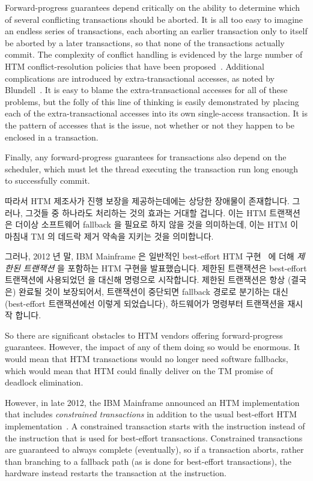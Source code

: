 Forward-progress guarantees depend critically on the ability to determine
which of several conflicting transactions should be aborted.
It is all too easy to imagine an endless series of transactions, each
aborting an earlier transaction only to itself be aborted by a later
transactions, so that none of the transactions actually commit.
The complexity of conflict handling is
evidenced by the large number of HTM conflict-resolution policies
that have been proposed~\cite{EgeAkpinar2011HTM2TLE,YujieLiu2011ToxicTransactions}.
Additional complications are introduced by extra-transactional accesses,
as noted by Blundell~\cite{Blundell2006TMdeadlock}.
It is easy to blame the extra-transactional accesses for all of these
problems, but the folly of this line of thinking is easily demonstrated
by placing each of the extra-transactional accesses into its own
single-access transaction.
It is the pattern of accesses that is the issue, not whether or not they
happen to be enclosed in a transaction.

Finally, any forward-progress guarantees for transactions also
depend on the scheduler, which must let the thread executing the
transaction run long enough to successfully commit.

\fi

따라서 HTM 제조사가 진행 보장을 제공하는데에는 상당한 장애물이 존재합니다.
그러나, 그것들 중 하나라도 처리하는 것의 효과는 거대할 겁니다.
이는 HTM 트랜잭션은 더이상 소프트웨어 fallback 을 필요로 하지 않을 것을
의미하는데, 이는 HTM 이 마침내 TM 의 데드락 제거 약속을 지키는 것을 의미합니다.

그러나, 2012 년 말, IBM Mainframe 은 일반적인 best-effort HTM
구현~\cite{ChristianJacobi2012MainframeTM} 에 더해 \emph{제한된 트랜잭션} 을
포함하는 HTM 구현을 발표했습니다.
제한된 트랜잭션은 best-effort 트랜잭션에 사용되었던  을 대신해
 명령으로 시작합니다.
제한된 트랜잭션은 항상 (결국은) 완료될 것이 보장되어서, 트랜잭션이 중단되면
fallback 경로로 분기하는 대신 (best-effort 트랜잭션에선 이렇게 되었습니다),
하드웨어가  명령부터 트랜잭션을 재시작 합니다.

\iffalse

So there are significant obstacles to HTM vendors offering forward-progress
guarantees.
However, the impact of any of them doing so would be enormous.
It would mean that HTM transactions would no longer need software
fallbacks, which would mean that HTM could finally deliver on the
TM promise of deadlock elimination.

However, in late 2012, the IBM Mainframe announced an HTM implementation
that includes \emph{constrained transactions} in addition to the usual
best-effort HTM
implementation~\cite{ChristianJacobi2012MainframeTM}.
A constrained transaction starts with the  instruction
instead of the  instruction that is used for best-effort
transactions.
Constrained transactions are guaranteed to always complete (eventually),
so if a transaction aborts, rather than branching to a fallback path
(as is done for best-effort transactions), the hardware instead restarts
the transaction at the  instruction.

